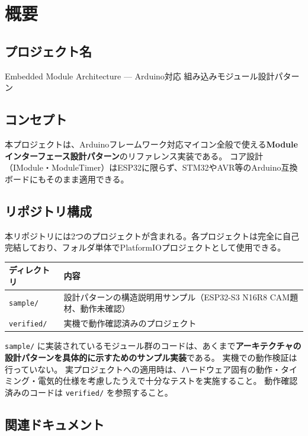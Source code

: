 \section{概要}

\subsection{プロジェクト名}
Embedded Module Architecture — Arduino対応 組み込みモジュール設計パターン

\subsection{コンセプト}
本プロジェクトは、Arduinoフレームワーク対応マイコン全般で使える\textbf{Moduleインターフェース設計パターン}のリファレンス実装である。
コア設計（IModule・ModuleTimer）はESP32に限らず、STM32やAVR等のArduino互換ボードにもそのまま適用できる。

\subsection{リポジトリ構成}

本リポジトリには2つのプロジェクトが含まれる。各プロジェクトは完全に自己完結しており、フォルダ単体でPlatformIOプロジェクトとして使用できる。

\begin{tabularx}{\textwidth}{l X}
\toprule
\textbf{ディレクトリ} & \textbf{内容} \\
\midrule
\texttt{sample/} & 設計パターンの構造説明用サンプル（ESP32-S3 N16R8 CAM題材、動作未確認） \\
\texttt{verified/} & 実機で動作確認済みのプロジェクト \\
\bottomrule
\end{tabularx}

\begin{cautionbox}
\texttt{sample/} に実装されているモジュール群のコードは、あくまで\textbf{アーキテクチャの設計パターンを具体的に示すためのサンプル実装}である。
実機での動作検証は行っていない。
実プロジェクトへの適用時は、ハードウェア固有の動作・タイミング・電気的仕様を考慮したうえで十分なテストを実施すること。
動作確認済みのコードは \texttt{verified/} を参照すること。
\end{cautionbox}

\subsection{関連ドキュメント}


